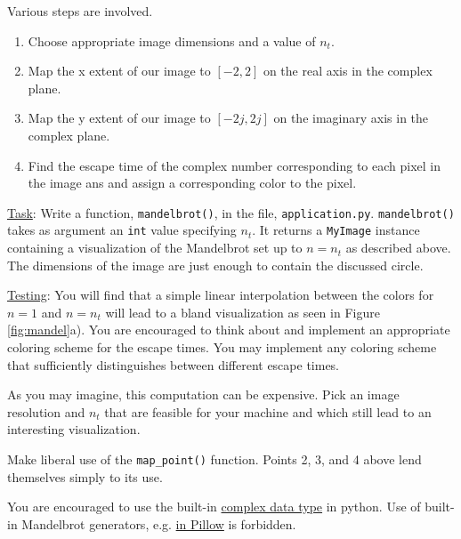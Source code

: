 \documentclass[addpoints]{exam}
\begin{document}
\begin{questions}
  Various steps are involved.
  \begin{enumerate}
\item Choose appropriate image dimensions and a value of $n_t$.
\item Map the x extent of our image to $[-2,2]$ on the real axis in the complex plane.
\item Map the y extent of our image to $[-2j,2j]$ on the imaginary axis in the complex plane.
\item Find the escape time of the complex number corresponding to each pixel in the image ans and assign a corresponding color to the pixel.
\end{enumerate}

  \underline{Task}: Write a function, \texttt{mandelbrot()}, in the file, \texttt{application.py}. \texttt{mandelbrot()} takes as argument an \texttt{int} value specifying $n_t$. It returns a \texttt{MyImage} instance containing a visualization of the Mandelbrot set up to $n=n_t$ as described above. The dimensions of the image are just enough to contain the discussed circle.

  \underline{Testing}: You will find that a simple linear interpolation between the colors for $n=1$ and $n=n_t$ will lead to a bland visualization as seen in Figure \ref{fig:mandel}a). You are encouraged to think about and implement an appropriate coloring scheme for the escape times. You may implement any coloring scheme that sufficiently distinguishes between different escape times.

  As you may imagine, this computation can be expensive. Pick an image resolution and $n_t$ that are feasible for your machine and which still lead to an interesting visualization.

  Make liberal use of the \texttt{map\_point()} function. Points 2, 3, and 4 above lend themselves simply to its use.

  You are encouraged to use the built-in \href{https://realpython.com/python-data-types/#complex-numbers}{complex data type} in python. Use of built-in Mandelbrot generators, e.g. \href{https://pillow.readthedocs.io/en/stable/reference/Image.html?highlight=mandelbrot#PIL.Image.effect_mandelbrot}{in Pillow} is forbidden.

\end{questions}
\end{document}
